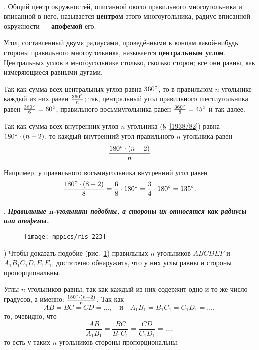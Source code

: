 \paragraph{}\label{1938/217}
.
Общий центр окружностей, описанной около правильного многоугольника и вписанной в него, называется \textbf{центром} этого многоугольника, радиус вписанной окружности — \textbf{апофемой} его.

{\sloppy 
Угол, составленный двумя радиусами, проведёнными к концам какой-нибудь стороны правильного многоугольника, называется \textbf{центральным углом}.
Центральных углов в многоугольнике столько, сколько сторон;
все они равны, как измеряющиеся равными дугами.

}

Так как сумма всех центральных углов равна $360\degree$, то в правильном $n$-угольнике каждый из них равен $\tfrac{360\degree}n$;
так, центральный угол правильного шестиугольника равен $\tfrac{360\degree}6\z=60\degree$, правильного восьмиугольника равен $\tfrac{360\degree}8 = 45\degree$ и так далее.

Так как сумма всех внутренних углов $n$-угольника (§~\ref{1938/82}) равна $180\degree\cdot(n-2)$, то каждый внутренний угол правильного $n$-угольника равен
\[\frac{180\degree\cdot(n-2)}{n}\]

Например, у правильного восьмиугольника внутренний угол равен
\[\frac{180\degree\cdot(8-2)}{8}=\frac{6}{8}\cdot 180\degree=\frac{3}{4}\cdot 180\degree=135\degree.\]

\paragraph{}\label{1938/218}
.
\textbf{\emph{Правильные $\bm{n}$-угольники подобны, а стороны их относятся как радиусы или апофемы.}}

\begin{figure}[!ht]
\centering
\texttt{[image: mppics/ris-223]}
\caption{}\label{1938/ris-223}
\end{figure}

{) Чтобы доказать подобие (рис.~\ref{1938/ris-223}) правильных $n$-угольников $ABCDEF$ и $A_1B_1C_1D_1E_1F_1$, достаточно обнаружить, что у них углы равны и стороны пропорциональны.

}

Углы $n$-угольников равны, так как каждый из них содержит одно и то же число градусов, а именно: $\frac{180\degree\cdot(n-2)}{n}$.
Так как 
\[AB=BC = CD=\dots,
\quad\text{и}\quad A_1B_1=B_1C_1 = C_1D_1=\dots,\]
то, очевидно, что
\[\frac{AB}{A_1B_1}=\frac{BC}{B_1C_1} = \frac{CD}{C_1D_1}=\dots;\]
то есть у таких $n$-угольников стороны пропорциональны.

